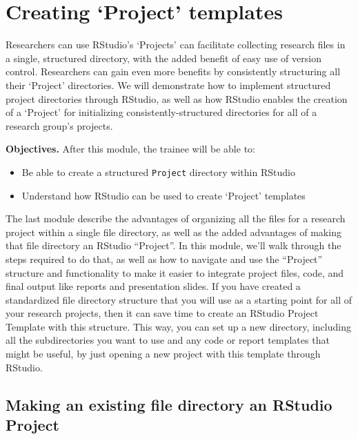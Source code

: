 \documentclass[]{tufte-book}
\providecommand{\tightlist}{%
  \setlength{\itemsep}{0pt}\setlength{\parskip}{0pt}}
\begin{document}
\hypertarget{creating-project-templates}{%
\section{Creating `Project' templates}\label{creating-project-templates}}

Researchers can use RStudio's `Projects' can facilitate collecting research
files in a single, structured directory, with the added benefit of easy use of
version control. Researchers can gain even more benefits by consistently
structuring all their `Project' directories. We will demonstrate how to
implement structured project directories through RStudio, as well as how RStudio
enables the creation of a `Project' for initializing consistently-structured
directories for all of a research group's projects.

\textbf{Objectives.} After this module, the trainee will be able to:

\begin{itemize}
\tightlist
\item
  Be able to create a structured \texttt{Project} directory within RStudio
\item
  Understand how RStudio can be used to create `Project' templates
\end{itemize}

The last module describe the advantages of organizing all the files for a
research project within a single file directory, as well as the added
advantages of making that file directory an RStudio ``Project''. In this
module, we'll walk through the steps required to do that, as well as
how to navigate and use the ``Project'' structure and functionality to
make it easier to integrate project files, code, and final output like
reports and presentation slides. If you have created a standardized
file directory structure that you will use as a starting point for all of
your research projects, then it can save time to create an RStudio Project
Template with this structure. This way, you can set up a new directory,
including all the subdirectories you want to use and any code or report
templates that might be useful, by just opening a new project with this
template through RStudio.

\hypertarget{making-an-existing-file-directory-an-rstudio-project}{%
\subsection{Making an existing file directory an RStudio Project}\label{making-an-existing-file-directory-an-rstudio-project}}
\end{document}
